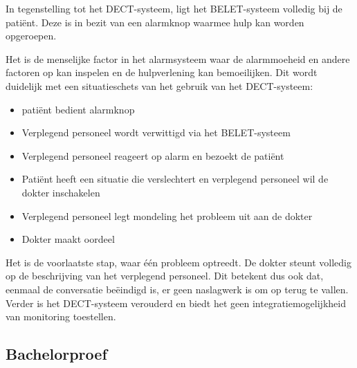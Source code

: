 In tegenstelling tot het DECT-systeem, ligt het BELET-systeem volledig bij de patiënt. Deze is in bezit van een alarmknop waarmee hulp kan worden opgeroepen.

Het is de menselijke factor in het alarmsysteem waar de alarmmoeheid en andere factoren op kan inspelen en de hulpverlening kan bemoeilijken. Dit wordt duidelijk met een situatieschets van het gebruik van het DECT-systeem:

\begin{itemize}
  \item patiënt bedient alarmknop
  \item Verplegend personeel wordt verwittigd via het BELET-systeem
  \item Verplegend personeel reageert op alarm en bezoekt de patiënt
  \item Patiënt heeft een situatie die verslechtert en verplegend personeel wil de dokter inschakelen
  \item Verplegend personeel legt mondeling het probleem uit aan de dokter
  \item Dokter maakt oordeel
\end{itemize}

Het is de voorlaatste stap, waar één probleem optreedt. De dokter steunt volledig op de beschrijving van het verplegend personeel. Dit betekent dus ook dat, eenmaal de conversatie beëindigd is, er geen naslagwerk is om op terug te vallen. Verder is het DECT-systeem verouderd en biedt het geen integratiemogelijkheid van monitoring toestellen.

\subsection{Bachelorproef}

